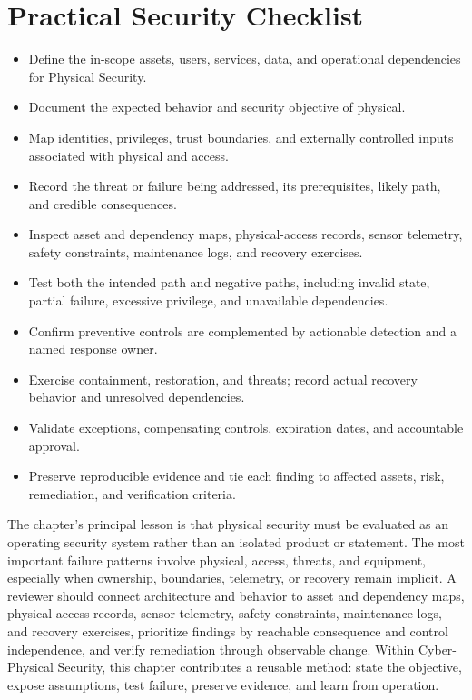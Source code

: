 \documentclass[11pt]{article}
\begin{document}
\section*{Practical Security Checklist}
\begin{itemize}[label=$\square$]
\item Define the in-scope assets, users, services, data, and operational dependencies for Physical Security.
\item Document the expected behavior and security objective of physical.
\item Map identities, privileges, trust boundaries, and externally controlled inputs associated with physical and access.
\item Record the threat or failure being addressed, its prerequisites, likely path, and credible consequences.
\item Inspect asset and dependency maps, physical-access records, sensor telemetry, safety constraints, maintenance logs, and recovery exercises.
\item Test both the intended path and negative paths, including invalid state, partial failure, excessive privilege, and unavailable dependencies.
\item Confirm preventive controls are complemented by actionable detection and a named response owner.
\item Exercise containment, restoration, and threats; record actual recovery behavior and unresolved dependencies.
\item Validate exceptions, compensating controls, expiration dates, and accountable approval.
\item Preserve reproducible evidence and tie each finding to affected assets, risk, remediation, and verification criteria.
\end{itemize}
\begin{synthesisbox}
The chapter's principal lesson is that physical security must be evaluated as an operating security system rather than an isolated product or statement. The most important failure patterns involve physical, access, threats, and equipment, especially when ownership, boundaries, telemetry, or recovery remain implicit. A reviewer should connect architecture and behavior to asset and dependency maps, physical-access records, sensor telemetry, safety constraints, maintenance logs, and recovery exercises, prioritize findings by reachable consequence and control independence, and verify remediation through observable change. Within Cyber-Physical Security, this chapter contributes a reusable method: state the objective, expose assumptions, test failure, preserve evidence, and learn from operation.
\end{synthesisbox}
\end{document}
